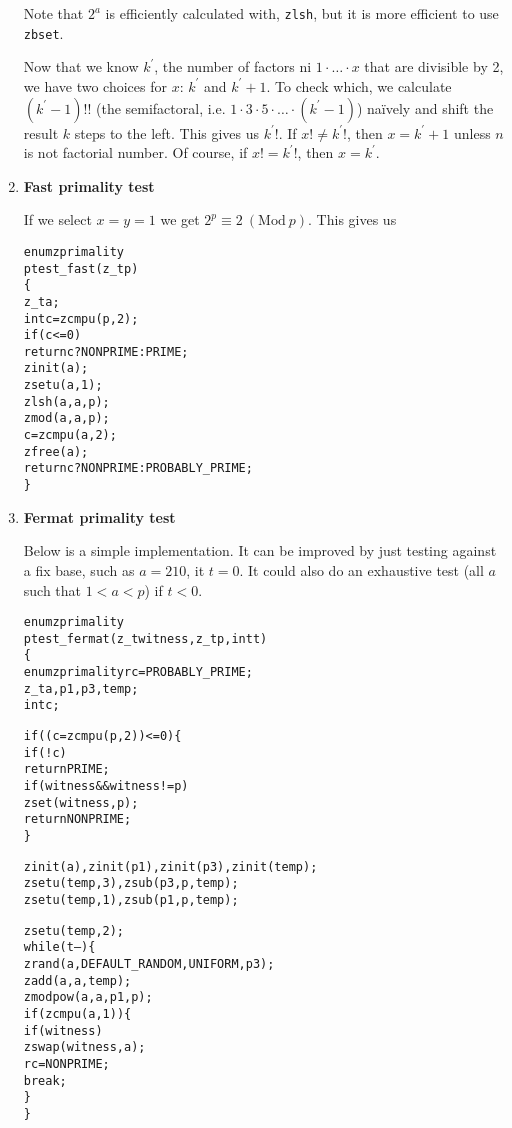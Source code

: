\begin{enumerate}[label=\textbf{\arabic*}.]
\noindent
Note that $2^a$ is efficiently calculated with,
\texttt{zlsh}, but it is more efficient to use
\texttt{zbset}.

Now that we know $k^\prime$, the number of
factors ni $1 \cdot \ldots \cdot x$ that are
divisible by 2, we have two choices for $x$:
$k^\prime$ and $k^\prime + 1$. To check which, we
calculate $(k^\prime - 1)!!$ (the semifactoral, i.e.
$1 \cdot 3 \cdot 5 \cdot \ldots \cdot (k^\prime - 1)$)
naïvely and shift the result $k$ steps to the left.
This gives us $k^\prime!$. If $x! \neq k^\prime!$, then
$x = k^\prime + 1$ unless $n$ is not factorial number.
Of course, if $x! = k^\prime!$, then $x = k^\prime$.



\item \textbf{Fast primality test}

If we select $x = y = 1$ we get
$2^p \equiv 2 ~(\text{Mod}~p)$. This gives us

\vspace{-1em}
\begin{alltt}
enum zprimality
ptest_fast(z_t p)
\{
    z_t a;
    int c = zcmpu(p, 2);
    if (c <= 0)
        return c ? NONPRIME : PRIME;
    zinit(a);
    zsetu(a, 1);
    zlsh(a, a, p);
    zmod(a, a, p);
    c = zcmpu(a, 2);
    zfree(a);
    return c ? NONPRIME : PROBABLY_PRIME;
\}
\end{alltt}
\vspace{-1em}



\item \textbf{Fermat primality test}

Below is a simple implementation. It can be improved by
just testing against a fix base, such as $a = 210$, it
$t = 0$. It could also do an exhaustive test (all $a$
such that $1 < a < p$) if $t < 0$.

\vspace{-1em}
\begin{alltt}
enum zprimality
ptest_fermat(z_t witness, z_t p, int t)
\{
    enum zprimality rc = PROBABLY_PRIME;
    z_t a, p1, p3, temp;
    int c;

    if ((c = zcmpu(p, 2)) <= 0) \{
        if (!c)
            return PRIME;
        if (witness && witness != p)
            zset(witness, p);
        return NONPRIME;
    \}

    zinit(a), zinit(p1), zinit(p3), zinit(temp);
    zsetu(temp, 3), zsub(p3, p, temp);
    zsetu(temp, 1), zsub(p1, p, temp);

    zsetu(temp, 2);
    while (t--) \{
        zrand(a, DEFAULT_RANDOM, UNIFORM, p3);
        zadd(a, a, temp);
        zmodpow(a, a, p1, p);
        if (zcmpu(a, 1)) \{
            if (witness)
                zswap(witness, a);
            rc = NONPRIME;
            break;
        \}
    \}


\end{alltt}
\end{enumerate}
